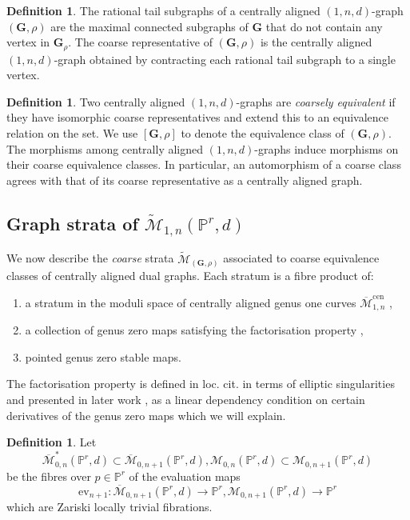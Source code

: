 \documentclass[12pt,reqno]{amsart}
\theoremstyle{definition}
\theoremstyle{definition}
\theoremstyle{definition}
\theoremstyle{definition}
\newtheorem{definition}[theorem]{Definition}
\newcommand{\ol}[1]{\overline{#1}}
\newcommand{\PP}{\mathbb{P}}
\newcommand{\Mcal}{\mathcal{M}}
\newcommand{\Mbar}{\ol{\Mcal}}
\newcommand{\M}{\mathcal{M}}
\newcommand{\Mtil}{\widetilde{\mathcal{M}}}
\begin{document}
\begin{definition}\label{defn:coarep}
  The rational tail subgraphs of a centrally aligned $(1,n,d)$-graph $(\mathbf{G}, \rho)$ are the maximal connected subgraphs of $\mathbf{G}$ that do not contain any vertex in $\mathbf{G}_\rho.$ The coarse representative of $(\mathbf{G}, \rho)$ is the centrally aligned $(1,n,d)$-graph obtained by contracting each rational tail subgraph to a single vertex.
\end{definition}

\begin{definition}\label{defn:coarcl}
  Two centrally aligned $(1,n,d)$-graphs are \emph{coarsely equivalent} if they have isomorphic coarse representatives and extend this to an equivalence relation on the set. We use $[\mathbf{G}, \rho]$ to denote the equivalence class of $(\mathbf{G}, \rho).$ The morphisms among centrally aligned $(1,n,d)$-graphs induce morphisms on their coarse equivalence classes. In particular, an automorphism of a coarse class agrees with that of its coarse representative as a centrally aligned graph.
\end{definition}

\subsection{Graph strata of $\Mtil_{1,n}(\PP^r,d)$}
We now describe the \emph{coarse} strata $\Mtil_{(\mathbf{G}, \rho)}$ associated to coarse equivalence classes of centrally aligned dual graphs. Each stratum is a fibre product of: \begin{enumerate}
  \item a stratum in the moduli space of centrally aligned genus one curves $\Mbar_{1,n}^{\mathrm{cen}}$ \cite[§3]{rspw},
  \item a collection of genus zero maps satisfying the factorisation property \cite[Definition 4.1]{rspw},
  \item pointed genus zero stable maps.
\end{enumerate}

The factorisation property is defined in loc. cit. in terms of elliptic singularities and presented in later work \cite[§2.4]{bnr}, \cite[Lemma 3.10]{vzdualcomplex} as a linear dependency condition on certain derivatives of the genus zero maps which we will explain.

\begin{definition}
  Let $$\Mbar_{0,n}^*(\PP^r,d)\subset \Mbar_{0,n+1}(\PP^r,d),\mathcal{M}_{0,n}(\PP^r,d)\subset \M_{0,n+1}(\PP^r,d)$$ be the fibres over $p\in \mathbb{P}^r$ of the evaluation maps $$\mathrm{ev}_{n+1}: \Mbar_{0,n+1}(\PP^r,d)\to \PP^r, \M_{0,n+1}(\PP^r,d)\to \PP^r$$
  which are Zariski locally trivial fibrations.
\end{definition}
\end{document}
